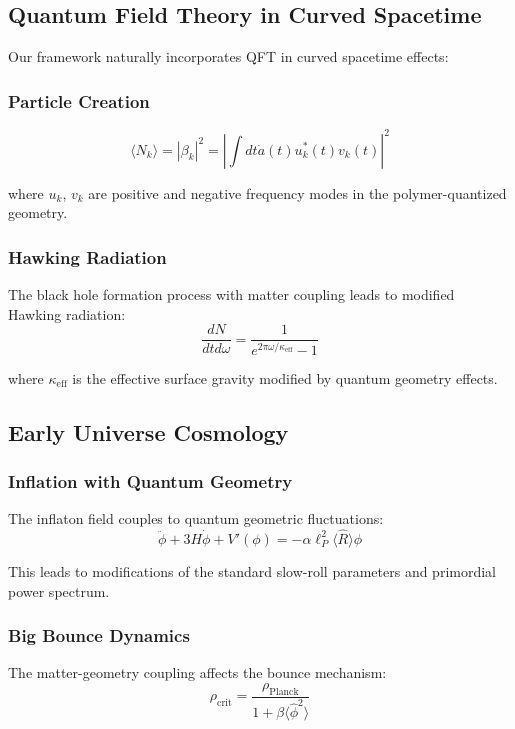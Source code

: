 \documentclass[11pt]{article}
\begin{document}
\subsection{Quantum Field Theory in Curved Spacetime}

Our framework naturally incorporates QFT in curved spacetime effects:

\subsubsection{Particle Creation}
\begin{equation}
\langle N_k \rangle = |\beta_k|^2 = \left|\int dt \dot{a}(t) u_k^*(t) v_k(t)\right|^2
\end{equation}

where $u_k$, $v_k$ are positive and negative frequency modes in the polymer-quantized geometry.

\subsubsection{Hawking Radiation}
The black hole formation process with matter coupling leads to modified Hawking radiation:
\begin{equation}
\frac{dN}{dt d\omega} = \frac{1}{e^{2\pi\omega/\kappa_{\text{eff}}} - 1}
\end{equation}

where $\kappa_{\text{eff}}$ is the effective surface gravity modified by quantum geometry effects.

\subsection{Early Universe Cosmology}

\subsubsection{Inflation with Quantum Geometry}
The inflaton field couples to quantum geometric fluctuations:
\begin{equation}
\ddot{\phi} + 3H\dot{\phi} + V'(\phi) = -\alpha \ell_P^2 \langle\hat{R}\rangle \phi
\end{equation}

This leads to modifications of the standard slow-roll parameters and primordial power spectrum.

\subsubsection{Big Bounce Dynamics}
The matter-geometry coupling affects the bounce mechanism:
\begin{equation}
\rho_{\text{crit}} = \frac{\rho_{\text{Planck}}}{1 + \beta \langle\hat{\phi}^2\rangle}
\end{equation}
\end{document}
